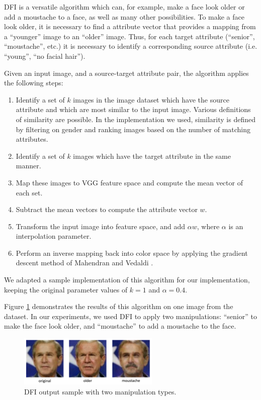 \documentclass[pageno]{cos429}
\begin{document}
DFI is a versatile algorithm which can, for example, make a face look older or add a moustache to a face, as well as many other possibilities. To make a face look older, it is necessary to find a attribute vector that provides a mapping from a ``younger'' image to an ``older'' image. Thus, for each target attribute (``senior'', ``moustache'', etc.) it is necessary to identify a corresponding source attribute (i.e. ``young'', ``no facial hair'').

Given an input image, and a source-target attribute pair, the algorithm applies the following steps:

\begin{enumerate}
    \item Identify a set of $k$ images in the image dataset which have the source attribute and which are most similar to the input image. Various definitions of similarity are possible. In the implementation we used, similarity is defined by filtering on gender and ranking images based on the number of matching attributes.
    \item Identify a set of $k$ images which have the target attribute in the same manner.
    \item Map these images to VGG feature space and compute the mean vector of each set.
    \item Subtract the mean vectors to compute the attribute vector $w$.
    \item Transform the input image into feature space, and add $\alpha w$, where $\alpha$ is an interpolation parameter.
    \item Perform an inverse mapping back into color space by applying the gradient descent method of Mahendran and Vedaldi \cite{DBLP:journals/corr/MahendranV14}.
\end{enumerate}

We adapted a sample implementation of this algorithm for our implementation, keeping the original parameter values of $k = 1$ and $\alpha = 0.4$.

Figure \ref{fig:dfi} demonstrates the results of this algorithm on one image from the dataset. In our experiments, we used DFI to apply two manipulations: ``senior'' to make the face look older, and ``moustache'' to add a moustache to the face.

\begin{figure}
    \centering
    \includegraphics[width=0.6\textwidth]{../figures/dfi.png}
    \caption{DFI output sample with two manipulation types.}
    \label{fig:dfi}
\end{figure}
\end{document}
